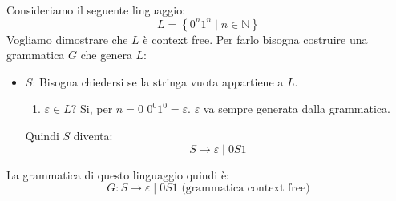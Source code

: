 \documentclass[a4paper]{article}
\begin{document}
\begin{example}
  Consideriamo il seguente linguaggio:
  \[
  L = \left\{ 0^n 1^n \;\left|\; n \in \mathbb{N} \right. \right\}
  \] 
  Vogliamo dimostrare che \( L \) è context free. Per farlo bisogna costruire una grammatica
  \( G \) che genera \( L \):
  \begin{itemize}
    \item \( S \): Bisogna chiedersi se la stringa vuota appartiene a \( L \).
      \begin{enumerate}
        \item \( \varepsilon \in L? \) Si, per \( n = 0 \) \( 0^0 1^0 = \varepsilon \).
          \( \varepsilon \) va sempre generata dalla grammatica.
      \end{enumerate}
      Quindi \( S \) diventa:
      \[
        S \to \varepsilon \;|\; 0 S 1
      \] 
  \end{itemize}
  La grammatica di questo linguaggio quindi è:
  \[
    G: S \to \varepsilon \;|\; 0 S 1 \text{ (grammatica context free)}
  \] 


\end{example}
\end{document}
